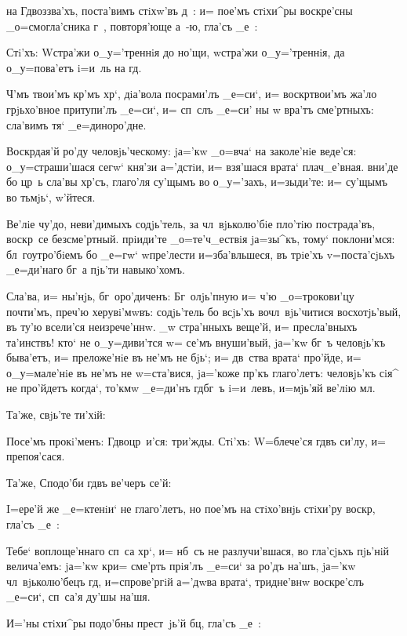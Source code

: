 
на Гд воззва'хъ, поста'вимъ стiхw'въ д~: и= пое'мъ 
стiхи^ры воскре'сны _о=смогла'сника г~, повторя'юще а~-ю, 
гла'съ _е~:

Стi'хъ: W\т стра'жи о_у='треннiя до но'щи, w\т стра'жи 
о_у='треннiя, да о_у=пова'етъ i=и~ль на гд.

Ч'мъ твои'мъ кр'мъ хр`, дiа'вола 
посрами'лъ _е=си`, и= воскр твои'мъ жа'ло 
грjьхо'вное притупи'лъ _е=си`, и= сп~слъ _е=си' ны w\т 
вра'тъ сме'ртныхъ: сла'вимъ тя` _е=диноро'дне.

Воскр дая'й ро'ду человjь'ческому: jа='кw _о=вча` 
на заколе'нiе веде'ся: о_у=страши'шася сегw` кня'зи 
а='дстiи, и= взя'шася врата` плач_е'вная. вни'де бо цр~ь 
сла'вы хр'съ, глаго'ля су'щымъ во о_у='захъ, 
и=зыди'те: и= су'щымъ во тьмjь`, w'йтеся.

Ве'лiе чу'до, неви'димыхъ содjь'тель, за 
чл~вjьколю'бiе пло'тiю пострада'въ, воскр~се 
безсме'ртный. прiиди'те _о=те'ч_ествiя jа=зы^къ, тому` 
поклони'мся: бл~гоутро'бiемъ бо _е=гw` w\т пре'лести 
и=зба'вльшеся, въ трiе'хъ v=поста'сjьхъ _е=ди'наго бг~а 
пjь'ти навыко'хомъ.

Сла'ва, и= ны'нjь, бг~оро'диченъ: Бг~олjь'пную и= 
ч'ю _о=трокови'цу почти'мъ, преч'ю херувi'мwвъ: 
содjь'тель бо всjь'хъ вочл~вjь'читися восхотjь'вый, въ 
ту'ю всели'ся неизрече'ннw. _w стра'нныхъ веще'й, и= 
пресла'вныхъ та'инствъ! кто` не о_у=диви'тся w= се'мъ 
внуши'вый, jа='кw бг~ъ человjь'къ быва'етъ, и= 
преложе'нiе въ не'мъ не бjь`; и= дв~ства врата` про'йде, 
и= о_у=мале'нiе въ не'мъ не w=ста'вися, jа='коже 
пр'къ глаго'летъ: человjь'къ сiя^ не про'йдетъ 
когда`, то'кмw _е=ди'нъ гд бг~ъ i=и~левъ, и=мjь'яй 
ве'лiю мл. 

Та'же, свjь'те ти'хiй:

Посе'мъ прокi'менъ: Гд воцр~и'ся: три'жды. Стi'хъ: 
W=блече'ся гд въ си'лу, и= препоя'сася. 

Та'же, Сподо'би гд въ ве'черъ се'й:

I=ере'й же _е=ктенiи` не глаго'летъ, но пое'мъ на 
стiхо'внjь стiхи'ру воскр, гла'съ _е~:

Тебе` воплоще'ннаго сп~са хр`, и= нб~съ не 
разлучи'вшася, во гла'сjьхъ пjь'нiй велича'емъ: jа='кw 
кр и= сме'рть прiя'лъ _е=си` за ро'дъ на'шъ, jа='кw 
чл~вjьколю'бецъ гд, и=спрове'ргiй а='дwва врата`, 
тридне'внw воскре'слъ _е=си`, сп~са'я ду'шы на'шя.

И='ны стiхи^ры подо'бны прест~jь'й бц, гла'съ _е~:

